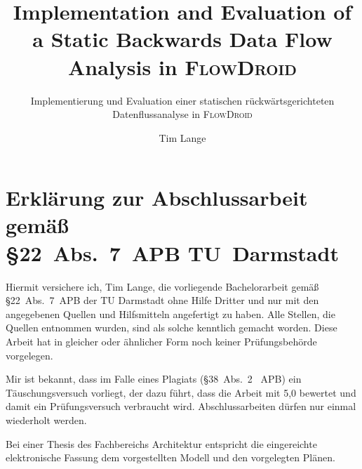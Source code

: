 \documentclass[
	english,
	ruledheaders=section,%
	class=report,%
	thesis={type=bachelor},%
	accentcolor=9c,%
	custommargins=true,%
	marginpar=false,%
	parskip=half-,%
	fontsize=11pt,%
	IMRAD=false,
	instbox=false
]{tudapub}
\title{Implementation and Evaluation of a Static Backwards Data Flow Analysis in \textsc{FlowDroid}}
\subtitle{Implementierung und Evaluation einer statischen rückwärtsgerichteten Datenflussanalyse in \textsc{FlowDroid}}
\author[T. Lange]{Tim Lange}%
\institute{Fraunhofer SIT}
\begin{document}
\maketitle

\tableofcontents
\newpage

\section*{Erklärung zur Abschlussarbeit gemäß\\ \S{}22~Abs.~7~APB TU~Darmstadt}
\begin{sloppypar}%
Hiermit versichere ich, Tim Lange, die vorliegende Bachelorarbeit gemäß \S{}22~Abs.~7~APB der TU Darmstadt ohne Hilfe Dritter und nur mit den angegebenen Quellen und Hilfsmitteln angefertigt zu haben.
Alle Stellen, die Quellen entnommen wurden, sind als solche kenntlich gemacht worden. Diese Arbeit hat in gleicher oder ähnlicher Form noch keiner Prüfungsbehörde vorgelegen.
\end{sloppypar}%
\par
Mir ist bekannt, dass im Falle eines Plagiats (\S{}38~Abs.~2 ~APB) ein Täuschungsversuch vorliegt, der dazu führt, dass die Arbeit mit 5,0 bewertet und damit ein Prüfungsversuch verbraucht wird. Abschlussarbeiten dürfen nur einmal wiederholt werden.
\par
Bei einer Thesis des Fachbereichs Architektur entspricht die eingereichte elektronische Fassung dem vorgestellten Modell und den vorgelegten Plänen.
\AffidavitSignature










\printbibliography[
	heading=bibintoc,
	title={Bibliography}
]


\end{document}
